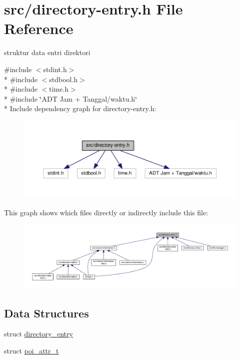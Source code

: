 \hypertarget{directory-entry_8h}{\section{src/directory-\/entry.h File Reference}
\label{directory-entry_8h}
}


struktur data entri direktori  


{\ttfamily \#include $<$stdint.\-h$>$}\\*
{\ttfamily \#include $<$stdbool.\-h$>$}\\*
{\ttfamily \#include $<$time.\-h$>$}\\*
{\ttfamily \#include \char`\"{}A\-D\-T Jam + Tanggal/waktu.\-h\char`\"{}}\\*
Include dependency graph for directory-\/entry.h\-:\nopagebreak
\begin{figure}[H]
\begin{center}
\leavevmode
\includegraphics[width=350pt]{directory-entry_8h__incl}
\end{center}
\end{figure}
This graph shows which files directly or indirectly include this file\-:
\nopagebreak
\begin{figure}[H]
\begin{center}
\leavevmode
\includegraphics[width=350pt]{directory-entry_8h__dep__incl}
\end{center}
\end{figure}
\subsection*{Data Structures}
\begin{DoxyCompactItemize}
\item 
struct \hyperlink{structdirectory__entry}{directory\-\_\-entry}
\item 
struct \hyperlink{structpoi__attr__t}{poi\-\_\-attr\-\_\-t}
\end{DoxyCompactItemize}
